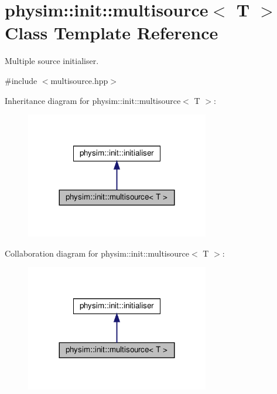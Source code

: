 \hypertarget{classphysim_1_1init_1_1multisource}{}\section{physim\+:\+:init\+:\+:multisource$<$ T $>$ Class Template Reference}
\label{classphysim_1_1init_1_1multisource}


Multiple source initialiser.  




{\ttfamily \#include $<$multisource.\+hpp$>$}



Inheritance diagram for physim\+:\+:init\+:\+:multisource$<$ T $>$\+:\nopagebreak
\begin{figure}[H]
\begin{center}
\leavevmode
\includegraphics[width=227pt]{classphysim_1_1init_1_1multisource__inherit__graph}
\end{center}
\end{figure}


Collaboration diagram for physim\+:\+:init\+:\+:multisource$<$ T $>$\+:\nopagebreak
\begin{figure}[H]
\begin{center}
\leavevmode
\includegraphics[width=227pt]{classphysim_1_1init_1_1multisource__coll__graph}
\end{center}
\end{figure}
